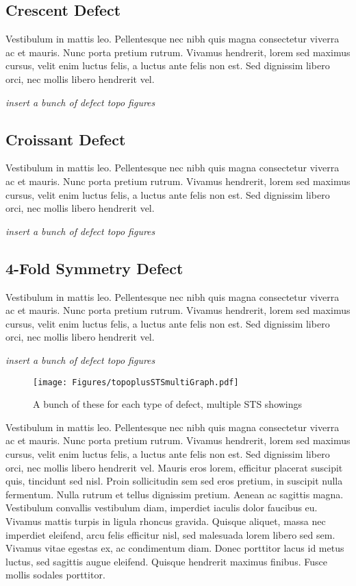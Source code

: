 \subsection{Crescent Defect}
Vestibulum in mattis leo. Pellentesque nec nibh quis magna consectetur viverra ac et mauris. Nunc porta pretium rutrum. Vivamus hendrerit, lorem sed maximus cursus, velit enim luctus felis, a luctus ante felis non est. Sed dignissim libero orci, nec mollis libero hendrerit vel. 

\emph{insert a bunch of defect topo figures}

\subsection{Croissant Defect}
Vestibulum in mattis leo. Pellentesque nec nibh quis magna consectetur viverra ac et mauris. Nunc porta pretium rutrum. Vivamus hendrerit, lorem sed maximus cursus, velit enim luctus felis, a luctus ante felis non est. Sed dignissim libero orci, nec mollis libero hendrerit vel. 

\emph{insert a bunch of defect topo figures}

\subsection{4-Fold Symmetry Defect}
Vestibulum in mattis leo. Pellentesque nec nibh quis magna consectetur viverra ac et mauris. Nunc porta pretium rutrum. Vivamus hendrerit, lorem sed maximus cursus, velit enim luctus felis, a luctus ante felis non est. Sed dignissim libero orci, nec mollis libero hendrerit vel. 

\emph{insert a bunch of defect topo figures}

    \begin{figure}
        \centering
        \texttt{[image: Figures/topoplusSTSmultiGraph.pdf]}
        \caption{A bunch of these for each type of defect, multiple STS showings}
        \label{fig:stm}
    \end{figure}
    


Vestibulum in mattis leo. Pellentesque nec nibh quis magna consectetur viverra ac et mauris. Nunc porta pretium rutrum. Vivamus hendrerit, lorem sed maximus cursus, velit enim luctus felis, a luctus ante felis non est. Sed dignissim libero orci, nec mollis libero hendrerit vel. Mauris eros lorem, efficitur placerat suscipit quis, tincidunt sed nisl. Proin sollicitudin sem sed eros pretium, in suscipit nulla fermentum. Nulla rutrum et tellus dignissim pretium. Aenean ac sagittis magna. Vestibulum convallis vestibulum diam, imperdiet iaculis dolor faucibus eu. Vivamus mattis turpis in ligula rhoncus gravida. Quisque aliquet, massa nec imperdiet eleifend, arcu felis efficitur nisl, sed malesuada lorem libero sed sem. Vivamus vitae egestas ex, ac condimentum diam. Donec porttitor lacus id metus luctus, sed sagittis augue eleifend. Quisque hendrerit maximus finibus. Fusce mollis sodales porttitor.

